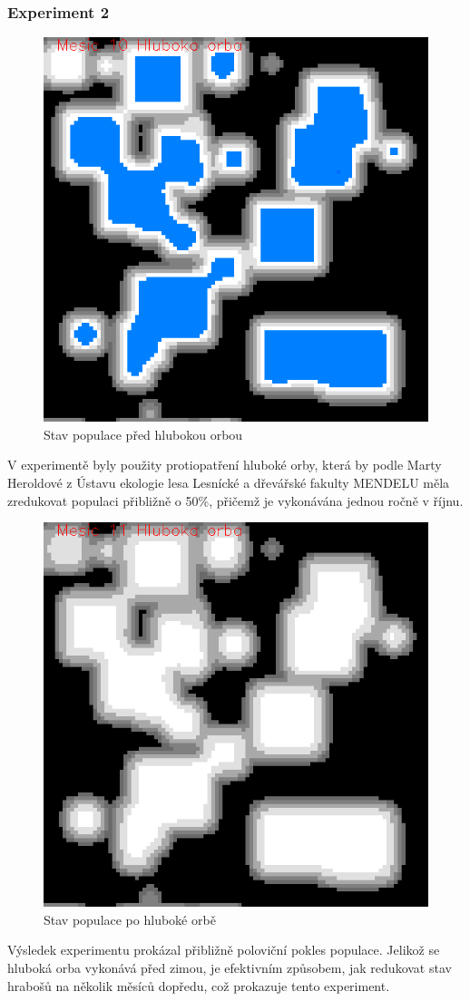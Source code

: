 \documentclass[a4paper,11pt]{article}
\begin{document}
\subsubsection{Experiment 2}
\begin{figure}[h]
\begin{center}
    \includegraphics[width=.4\linewidth]{hlub_orba10.png}
    \caption{Stav populace před hlubokou orbou}
    \label{exp2_obr1}
\end{center}
\end{figure}

V experimentě byly použity protiopatření hluboké orby, která by podle Marty Heroldové z Ústavu ekologie lesa Lesnícké a dřevářské fakulty MENDELU měla zredukovat populaci přibližně o 50\%, přičemž je vykonávána jednou ročně v říjnu. 

\begin{figure}[h]
\begin{center}
    \includegraphics[width=.4\linewidth]{hlub_orba11.png}
    \caption{Stav populace po hluboké orbě}
    \label{exp2_obr2}
\end{center}
\end{figure}

Výsledek experimentu prokázal přibližně poloviční pokles populace. Jelikož se hluboká orba vykonává před zimou, je efektivním způsobem, jak redukovat stav hrabošů na několik měsíců dopředu, což prokazuje tento experiment.

\newpage
\end{document}
